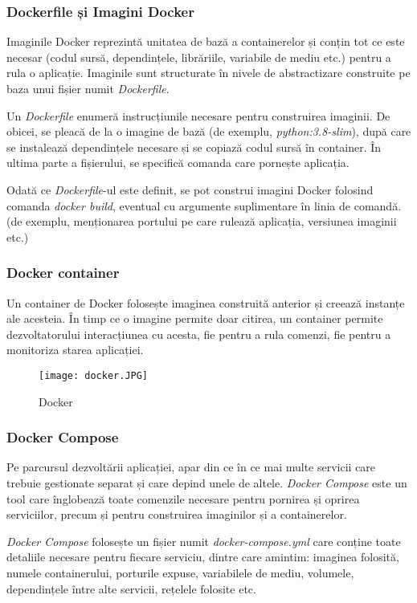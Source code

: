 \subsubsection{Dockerfile și Imagini Docker}
\par
Imaginile Docker reprezintă unitatea de bază a containerelor și conțin tot ce este necesar (codul sursă,
dependințele, librăriile, variabile de mediu etc.) pentru a rula o aplicație. Imaginile
sunt structurate în nivele de abstractizare construite pe baza unui fișier numit \textit{Dockerfile}.
\par
Un \textit{Dockerfile} enumeră instrucțiunile necesare pentru construirea imaginii. De obicei, se pleacă
de la o imagine de bază (de exemplu, \textit{python:3.8-slim}), după care se instalează dependințele
necesare și se copiază codul sursă în container. În ultima parte a fișierului, se specifică comanda
care pornește aplicația.
\par
Odată ce \textit{Dockerfile}-ul este definit, se pot construi imagini Docker folosind comanda \textit{docker build},
eventual cu argumente suplimentare în linia de comandă. (de exemplu, menționarea portului pe care rulează aplicația, 
versiunea imaginii etc.)

\subsubsection{Docker container}
\par
Un container de Docker folosește imaginea construită anterior și creează instanțe ale acesteia. În timp ce
o imagine permite doar citirea, un container permite dezvoltatorului interacțiunea cu acesta, fie pentru
a rula comenzi, fie pentru a monitoriza starea aplicației.

\begin{figure}[h]
    \centering
    \texttt{[image: docker.JPG]}
    \caption{Docker\protect\footnotemark[4]}
    \label{fig:docker}
\end{figure}

\subsubsection{Docker Compose}
\par
Pe parcursul dezvoltării aplicației, apar din ce în ce mai multe servicii care trebuie gestionate separat
și care depind unele de altele. \textit{Docker Compose} este un tool care înglobează toate comenzile necesare
pentru pornirea și oprirea serviciilor, precum și pentru construirea imaginilor și a containerelor.
\par
\textit{Docker Compose} folosește un fișier numit \textit{docker-compose.yml} care conține toate detaliile necesare
pentru fiecare serviciu, dintre care amintim: imaginea folosită, numele containerului, porturile expuse,
variabilele de mediu, volumele, dependințele între alte servicii, rețelele folosite etc.

